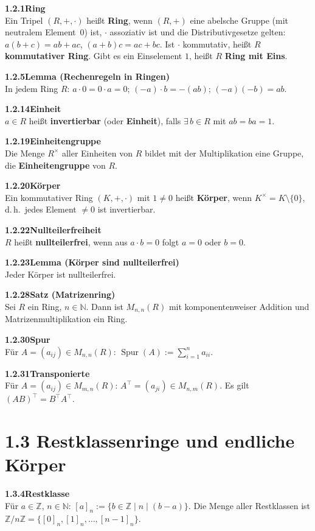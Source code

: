 \documentclass[a4paper,12pt]{article}
\newcommand{\gentry}[3]{%
  \noindent\textbf{#1\quad #2}\nopagebreak\\[0.2em]
  #3\par\smallskip
}
\begin{document}
\gentry{1.2.1}{Ring}{%
  Ein Tripel $(R, +, \cdot)$ heißt \textbf{Ring}, wenn $(R,+)$ eine abelsche Gruppe (mit neutralem Element~$0$) ist, $\cdot$ assoziativ ist und die Distributivgesetze gelten:
  $a(b+c) = ab + ac$, $(a+b)c = ac + bc$.
  Ist $\cdot$ kommutativ, heißt $R$ \textbf{kommutativer Ring}. Gibt es ein Einselement $1$, heißt $R$ \textbf{Ring mit Eins}.
}

\gentry{1.2.5}{Lemma (Rechenregeln in Ringen)}{%
  In jedem Ring $R$: $a \cdot 0 = 0 \cdot a = 0$; \quad $(-a) \cdot b = -(ab)$; \quad $(-a)(-b) = ab$.
}

\gentry{1.2.14}{Einheit}{%
  $a \in R$ heißt \textbf{invertierbar} (oder \textbf{Einheit}), falls $\exists\, b \in R$ mit $ab = ba = 1$.
}

\gentry{1.2.19}{Einheitengruppe}{%
  Die Menge $R^\times$ aller Einheiten von $R$ bildet mit der Multiplikation eine Gruppe, die \textbf{Einheitengruppe} von $R$.
}

\gentry{1.2.20}{Körper}{%
  Ein kommutativer Ring $(K, +, \cdot)$ mit $1 \neq 0$ heißt \textbf{Körper}, wenn $K^\times = K \setminus \{0\}$, d.\,h.\ jedes Element $\neq 0$ ist invertierbar.
}

\gentry{1.2.22}{Nullteilerfreiheit}{%
  $R$ heißt \textbf{nullteilerfrei}, wenn aus $a \cdot b = 0$ folgt $a = 0$ oder $b = 0$.
}

\gentry{1.2.23}{Lemma (Körper sind nullteilerfrei)}{Jeder Körper ist nullteilerfrei.}

\gentry{1.2.28}{Satz (Matrizenring)}{%
  Sei $R$ ein Ring, $n \in \mathbb{N}$. Dann ist $M_{n,n}(R)$ mit komponentenweiser Addition und Matrizenmultiplikation ein Ring.
}

\gentry{1.2.30}{Spur}{%
  Für $A = (a_{ij}) \in M_{n,n}(R)$: $\operatorname{Spur}(A) := \sum_{i=1}^n a_{ii}$.
}

\gentry{1.2.31}{Transponierte}{%
  Für $A = (a_{ij}) \in M_{m,n}(R)$: $A^\top = (a_{ji}) \in M_{n,m}(R)$. Es gilt $(AB)^\top = B^\top A^\top$.
}

\section*{1.3 \quad Restklassenringe und endliche Körper}

\gentry{1.3.4}{Restklasse}{%
  Für $a \in \mathbb{Z}$, $n \in \mathbb{N}$: $[a]_n := \{b \in \mathbb{Z} \mid n \mid (b-a)\}$. Die Menge aller Restklassen ist $\mathbb{Z}/n\mathbb{Z} = \{[0]_n, [1]_n, \ldots, [n-1]_n\}$.
}
\end{document}
